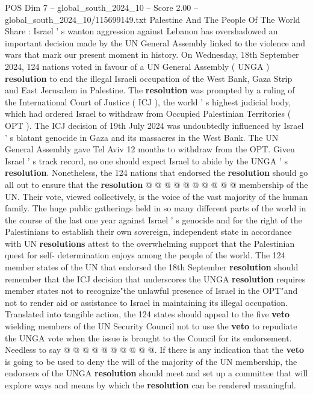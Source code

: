 \begin{textsample}{POS Dim 7 – global\_south\_2024\_10 – Score 2.00 – global\_south\_2024\_10/115699149.txt}  \label{ex:f7_pos_204}
Palestine And The People Of The World Share : Israel ' s wanton aggression against Lebanon has overshadowed an important decision made by the UN General Assembly linked to the violence and wars that mark our present moment in history.
On Wednesday, 18th September 2024, 124 nations voted in favour of a UN General Assembly ( UNGA ) \textbf{resolution} to end the illegal Israeli occupation of the West Bank, Gaza Strip and East Jerusalem in Palestine.
The \textbf{resolution} was prompted by a ruling of the International Court of Justice ( ICJ ), the world ' s highest judicial body, which had ordered Israel to withdraw from Occupied Palestinian Territories ( OPT ).
The ICJ decision of 19th July 2024 was undoubtedly influenced by Israel ' s blatant genocide in Gaza and its massacres in the West Bank.
The UN General Assembly gave Tel Aviv 12 months to withdraw from the OPT.
Given Israel ' s track record, no one should expect Israel to abide by the UNGA ' s \textbf{resolution}.
Nonetheless, the 124 nations that endorsed the \textbf{resolution} should go all out to ensure that the \textbf{resolution} @ @ @ @ @ @ @ @ @ @ membership of the UN.
Their vote, viewed collectively, is the voice of the vast majority of the human family.
The huge public gatherings held in so many different parts of the world in the course of the last one year against Israel ' s genocide and for the right of the Palestinians to establish their own sovereign, independent state in accordance with UN \textbf{resolutions} attest to the overwhelming support that the Palestinian quest for self- determination enjoys among the people of the world.
The 124 member states of the UN that endorsed the 18th September \textbf{resolution} should remember that the ICJ decision that underscores the UNGA \textbf{resolution} requires member states not to recognize"the unlawful presence of Israel in the OPT"and not to render aid or assistance to Israel in maintaining its illegal occupation.
Translated into tangible action, the 124 states should appeal to the five \textbf{veto} wielding members of the UN Security Council not to use the \textbf{veto} to repudiate the UNGA vote when the issue is brought to the Council for its endorsement.
Needless to say @ @ @ @ @ @ @ @ @ @.
If there is any indication that the \textbf{veto} is going to be used to deny the will of the majority of the UN membership, the endorsers of the UNGA \textbf{resolution} should meet and set up a committee that will explore ways and means by which the \textbf{resolution} can be rendered meaningful.

\end{textsample}
